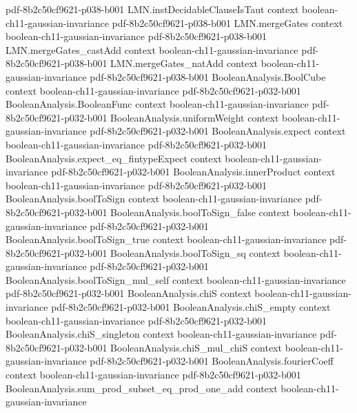 \begin{theorem}
  {pdf-8b2c50cf9621-p038-b001}
\proofstep
  {LMN.instDecidableClauseIsTaut}
  {context}
  {boolean-ch11-gaussian-invariance}
  {pdf-8b2c50cf9621-p038-b001}
\proofstep
  {LMN.mergeGates}
  {context}
  {boolean-ch11-gaussian-invariance}
  {pdf-8b2c50cf9621-p038-b001}
\proofstep
  {LMN.mergeGates_castAdd}
  {context}
  {boolean-ch11-gaussian-invariance}
  {pdf-8b2c50cf9621-p038-b001}
\proofstep
  {LMN.mergeGates_natAdd}
  {context}
  {boolean-ch11-gaussian-invariance}
  {pdf-8b2c50cf9621-p038-b001}
\proofstep
  {BooleanAnalysis.BoolCube}
  {context}
  {boolean-ch11-gaussian-invariance}
  {pdf-8b2c50cf9621-p032-b001}
\proofstep
  {BooleanAnalysis.BooleanFunc}
  {context}
  {boolean-ch11-gaussian-invariance}
  {pdf-8b2c50cf9621-p032-b001}
\proofstep
  {BooleanAnalysis.uniformWeight}
  {context}
  {boolean-ch11-gaussian-invariance}
  {pdf-8b2c50cf9621-p032-b001}
\proofstep
  {BooleanAnalysis.expect}
  {context}
  {boolean-ch11-gaussian-invariance}
  {pdf-8b2c50cf9621-p032-b001}
\proofstep
  {BooleanAnalysis.expect_eq_fintypeExpect}
  {context}
  {boolean-ch11-gaussian-invariance}
  {pdf-8b2c50cf9621-p032-b001}
\proofstep
  {BooleanAnalysis.innerProduct}
  {context}
  {boolean-ch11-gaussian-invariance}
  {pdf-8b2c50cf9621-p032-b001}
\proofstep
  {BooleanAnalysis.boolToSign}
  {context}
  {boolean-ch11-gaussian-invariance}
  {pdf-8b2c50cf9621-p032-b001}
\proofstep
  {BooleanAnalysis.boolToSign_false}
  {context}
  {boolean-ch11-gaussian-invariance}
  {pdf-8b2c50cf9621-p032-b001}
\proofstep
  {BooleanAnalysis.boolToSign_true}
  {context}
  {boolean-ch11-gaussian-invariance}
  {pdf-8b2c50cf9621-p032-b001}
\proofstep
  {BooleanAnalysis.boolToSign_sq}
  {context}
  {boolean-ch11-gaussian-invariance}
  {pdf-8b2c50cf9621-p032-b001}
\proofstep
  {BooleanAnalysis.boolToSign_mul_self}
  {context}
  {boolean-ch11-gaussian-invariance}
  {pdf-8b2c50cf9621-p032-b001}
\proofstep
  {BooleanAnalysis.chiS}
  {context}
  {boolean-ch11-gaussian-invariance}
  {pdf-8b2c50cf9621-p032-b001}
\proofstep
  {BooleanAnalysis.chiS_empty}
  {context}
  {boolean-ch11-gaussian-invariance}
  {pdf-8b2c50cf9621-p032-b001}
\proofstep
  {BooleanAnalysis.chiS_singleton}
  {context}
  {boolean-ch11-gaussian-invariance}
  {pdf-8b2c50cf9621-p032-b001}
\proofstep
  {BooleanAnalysis.chiS_mul_chiS}
  {context}
  {boolean-ch11-gaussian-invariance}
  {pdf-8b2c50cf9621-p032-b001}
\proofstep
  {BooleanAnalysis.fourierCoeff}
  {context}
  {boolean-ch11-gaussian-invariance}
  {pdf-8b2c50cf9621-p032-b001}
\proofstep
  {BooleanAnalysis.sum_prod_subset_eq_prod_one_add}
  {context}
  {boolean-ch11-gaussian-invariance}

\end{theorem}

